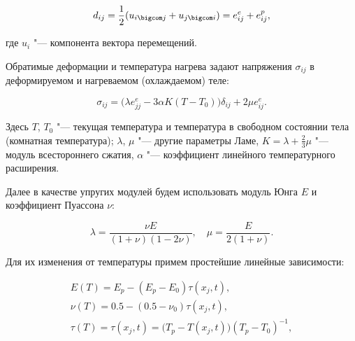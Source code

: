 \begin{equation} 

\label{eq:ulg:1} 

d_{ij} =\frac{1}{2} (u_{i\bigcom j} +u_{j\bigcom i} )=e_{ij}^{e} +e_{ij}^{p},

\end{equation} 

где  $u_{i} $ "--- компонента вектора перемещений.

Обратимые деформации и температура нагрева задают напряжения $\sigma _{ij} $ в деформируемом и нагреваемом (охлаждаемом) теле:

\begin{equation} 

\label{eq:ulg:2} 

\sigma _{ij} =\bigl(\lambda e_{jj}^{e} -3\alpha K(T-T_{0} )\bigr)\delta _{ij} +2\mu e_{ij}^{e}  .

\end{equation} 

Здесь $T$, $T_{0} $ "--- текущая температура и температура в свободном состоянии тела (комнатная температура); $\lambda $, $\mu $ "--- другие параметры Ламе, $K=\lambda +\frac{2}{3} \mu $ "--- модуль всестороннего сжатия, $\alpha $ "--- коэффициент линейного температурного расширения.  

Далее в качестве упругих модулей будем использовать модуль Юнга $E $ и коэффициент Пуассона $\nu$:

\[

\lambda =\frac{\nu E }{(1+\nu)(1-2\nu)} ,\quad  

\mu =\frac{E}{2(1+\nu)} .

\] 

Для их изменения от температуры примем   простейшие линейные зависимости:

\begin{equation} 

\label{eq:ulg:3} 

\begin{array}{l} 

E(T)=E_{p} - (E_{p} -E_{0} )\tau (x_{j} ,t), 

\\ 

\nu (T)=0.5-(0.5-\nu _{0} )\tau (x_{j} ,t), 

\\ 

\tau (T)=\tau (x_{j} ,t)= \bigl(T_{p} -T(x_{j} ,t)\bigr)(T_{p} -T_{0} )^{-1} ,

\end{array} 

\end{equation} 

